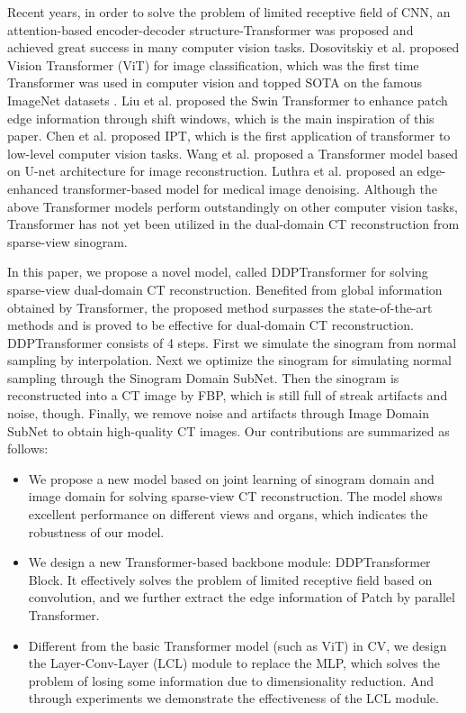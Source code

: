 \documentclass[lettersize,journal]{IEEEtran}
\begin{document}
Recent years, in order to solve the problem of limited receptive field of CNN, an attention-based encoder-decoder structure-Transformer\cite{vaswani2017attention} was proposed and achieved great success in many computer vision tasks. Dosovitskiy et al. \cite{dosovitskiy2020vit} proposed Vision Transformer (ViT) for image classification, which was the first time Transformer was used in computer vision and topped SOTA on the famous ImageNet datasets \cite{2009ImageNet}. Liu et al. \cite{liu2021Swin} proposed the Swin Transformer to enhance patch edge information through shift windows, which is the main inspiration of this paper. Chen et al. proposed IPT\cite {chen2021pre}, which is the first application of transformer to low-level computer vision tasks. Wang et al. proposed a Transformer model based on U-net architecture \cite{wang2021uformer} for image reconstruction. Luthra et al. \cite{2021Eformer} proposed an edge-enhanced transformer-based model for medical image denoising. Although the above Transformer models perform outstandingly on other computer vision tasks, Transformer has not yet been utilized in the dual-domain CT reconstruction from sparse-view sinogram.

In this paper, we propose a novel model, called DDPTransformer for solving sparse-view dual-domain CT reconstruction. Benefited from global information obtained by Transformer, the proposed method surpasses the state-of-the-art methods and is proved to be effective for dual-domain CT reconstruction. DDPTransformer consists of 4 steps. First we simulate the sinogram from normal sampling by interpolation. Next we optimize the sinogram for simulating normal sampling through the Sinogram Domain SubNet. Then the sinogram is reconstructed into a CT image by FBP, which is still full of streak artifacts and noise, though. Finally, we remove noise and artifacts through Image Domain SubNet to obtain high-quality CT images. Our contributions are summarized as follows:
\begin{itemize}
	\item{We propose a new model based on joint learning of sinogram domain and image domain for solving sparse-view CT reconstruction. The model shows excellent performance on different views and organs, which indicates the robustness of our model.}
	\item{We design a new Transformer-based backbone module: DDPTransformer Block. It effectively solves the problem of limited receptive field based on convolution, and we further extract the edge information of Patch by parallel Transformer.}
	\item{Different from the basic Transformer model (such as ViT) in CV, we design the Layer-Conv-Layer (LCL) module to replace the MLP, which solves the problem of losing some information due to dimensionality reduction. And through experiments we demonstrate the effectiveness of the LCL module.}
\end{itemize}
\end{document}
